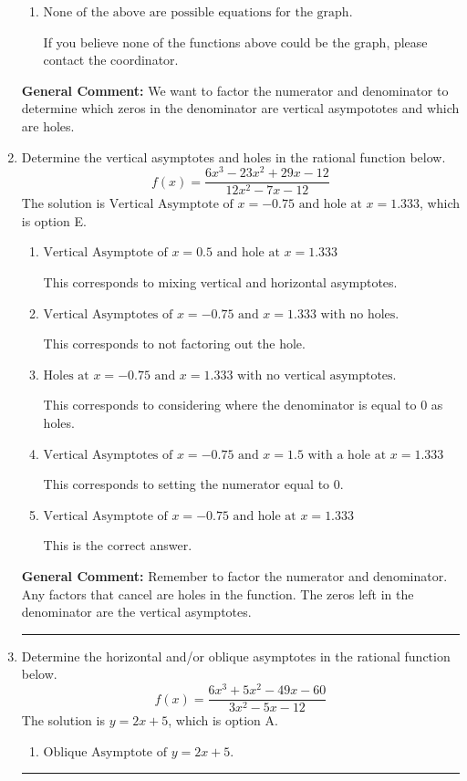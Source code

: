 \documentclass{extbook}[14pt]
\newcommand{\litem}[1]{\item #1

\rule{\textwidth}{0.4pt}}
\begin{document}
\begin{enumerate}
{\begin{enumerate}[label=\Alph*.]
You treated all of the zeros in the denominator as vertical asmptotes when some of them were holes and wrote factors as $x+z$.
\item \( \text{None of the above are possible equations for the graph.} \)

If you believe none of the functions above could be the graph, please contact the coordinator.
\end{enumerate}

\textbf{General Comment:} We want to factor the numerator and denominator to determine which zeros in the denominator are vertical asympototes and which are holes.
}
\litem{
Determine the vertical asymptotes and holes in the rational function below.
\[ f(x) = \frac{6x^{3} -23 x^{2} +29 x -12}{12x^{2} -7 x -12} \]The solution is \( \text{Vertical Asymptote of } x = -0.75 \text{ and hole at } x = 1.333 \), which is option E.\begin{enumerate}[label=\Alph*.]
\item \( \text{Vertical Asymptote of } x = 0.5 \text{ and hole at } x = 1.333 \)

This corresponds to mixing vertical and horizontal asymptotes.
\item \( \text{Vertical Asymptotes of } x = -0.75 \text{ and } x = 1.333 \text{ with no holes.} \)

This corresponds to not factoring out the hole.
\item \( \text{Holes at } x = -0.75 \text{ and } x = 1.333 \text{ with no vertical asymptotes.} \)

This corresponds to considering where the denominator is equal to 0 as holes.
\item \( \text{Vertical Asymptotes of } x = -0.75 \text{ and } x = 1.5 \text{ with a hole at } x = 1.333 \)

This corresponds to setting the numerator equal to 0.
\item \( \text{Vertical Asymptote of } x = -0.75 \text{ and hole at } x = 1.333 \)

This is the correct answer.
\end{enumerate}

\textbf{General Comment:} Remember to factor the numerator and denominator. Any factors that cancel are holes in the function. The zeros left in the denominator are the vertical asymptotes.
}
\litem{
Determine the horizontal and/or oblique asymptotes in the rational function below.
\[ f(x) = \frac{6x^{3} +5 x^{2} -49 x -60}{3x^{2} -5 x -12} \]The solution is \( y = 2x + 5 \), which is option A.\begin{enumerate}[label=\Alph*.]
\item \( \text{Oblique Asymptote of } y = 2x + 5. \)


\end{enumerate}}
\end{enumerate}
\end{document}
